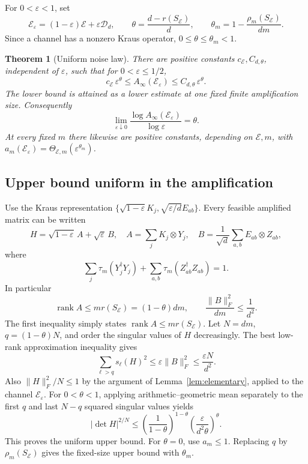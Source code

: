 \documentclass[11pt,a4paper]{article}
\newtheorem{theorem}{Theorem}
\theoremstyle{remark}\newtheorem{remark}[theorem]{Remark}
\newcommand{\rank}{\operatorname{rank}}
\newcommand{\D}{\mathcal D}
\newcommand{\E}{\mathcal E}
\newcommand{\Ainf}{A_\infty}
\begin{document}
For \(0<\varepsilon<1\), set
\[
 \E_\varepsilon=(1-\varepsilon)\E+\varepsilon\D_d,\qquad
 \theta=\frac{d-r(S_\E)}d,\qquad
 \theta_m=1-\frac{\rho_m(S_\E)}{dm}.
\]
Since a channel has a nonzero Kraus operator, \(0\le\theta\le\theta_m<1\).

\begin{theorem}[Uniform noise law]\label{thm:noise}
There are positive constants \(c_\E,C_{d,\theta}\), independent of \(\varepsilon\), such that for \(0<\varepsilon\le1/2\),
\begin{equation}\label{eq:noiselaw}
 c_\E\,\varepsilon^\theta
 \le \Ainf(\E_\varepsilon)
 \le C_{d,\theta}\,\varepsilon^\theta .
\end{equation}
The lower bound is attained as a lower estimate at one fixed finite amplification size. Consequently
\[
 \lim_{\varepsilon\downarrow0}
 \frac{\log\Ainf(\E_\varepsilon)}{\log\varepsilon}
 =\theta .
\]
At every fixed \(m\) there likewise are positive constants, depending on \(\E,m\), with
\(a_m(\E_\varepsilon)=\Theta_{\E,m}(\varepsilon^{\theta_m})\).
\end{theorem}

\subsection{Upper bound uniform in the amplification}
Use the Kraus representation
\(\{\sqrt{1-\varepsilon}K_j,\sqrt{\varepsilon/d}E_{ab}\}\).
Every feasible amplified matrix can be written
\[
 H=\sqrt{1-\varepsilon}\,A+\sqrt\varepsilon\,B,\quad
 A=\sum_jK_j\otimes Y_j,\quad
 B=\frac1{\sqrt d}\sum_{a,b}E_{ab}\otimes Z_{ab},
\]
where
\[
 \sum_j\tau_m(Y_j^\dagger Y_j)
 +\sum_{a,b}\tau_m(Z_{ab}^\dagger Z_{ab})=1.
\]
In particular
\[
 \rank A\le mr(S_\E)=(1-\theta)dm,\qquad
 \frac{\|B\|_F^2}{dm}\le\frac1{d^2}.
\]
The first inequality simply states \(\rank A\le mr(S_\E)\).
Let \(N=dm\), \(q=(1-\theta)N\), and order the singular values of \(H\) decreasingly. The best low-rank approximation inequality gives
\[
 \sum_{\ell>q}s_\ell(H)^2\le\varepsilon\|B\|_F^2
 \le\frac{\varepsilon N}{d^2}.
\]
Also \(\|H\|_F^2/N\le1\) by the argument of Lemma~\ref{lem:elementary}, applied to the channel \(\E_\varepsilon\).
For \(0<\theta<1\), applying arithmetic--geometric mean separately to the first \(q\) and last \(N-q\) squared singular values yields
\begin{equation}\label{eq:uniformupper}
 |\det H|^{2/N}
 \le \left(\frac1{1-\theta}\right)^{1-\theta}
      \left(\frac{\varepsilon}{d^2\theta}\right)^\theta .
\end{equation}
This proves the uniform upper bound. For \(\theta=0\), use \(a_m\le1\).
Replacing \(q\) by \(\rho_m(S_\E)\) gives the fixed-size upper bound with \(\theta_m\).
\end{document}
